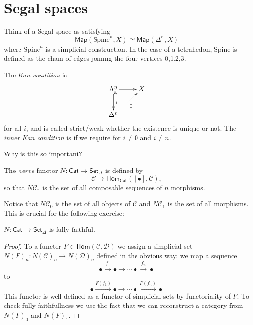 \section{Segal spaces}
\label{section-segal}


\begin{remark}
\label{remark-Segal-spaces}
Think of a Segal space as satisfying
$$
\mathsf{Map}(\text{Spine}^n,X) \simeq \mathsf{Map}(\Delta^n,X)
$$
where $\text{Spine}^n$ is a simplicial construction. 
In the case of a tetrahedon, $\text{Spine}$ is defined as the
chain of edges joining the four vertices 0,1,2,3.
\end{remark}


The {\it Kan condition} is
$$
\xymatrix{
\Lambda^n_i\ar@{^{(}->}[d]^i \ar[r]&  X\\
\Delta^n\ar@{.>}[ur]_{\exists }
}
$$
for all $i$, 
and is called strict/weak whether the existence
is unique or not. The {\it inner Kan condition} 
is if we require for $i \neq 0$ and $i\neq n$.

Why is this so important?

\begin{definition}
\label{definition-nerve}
The {\it nerve} functor $N:\mathsf{Cat} \to \mathsf{Set}_\Delta$ 
is defined by
$$
\mathcal{C} \mapsto  \mathsf{Hom}_{\mathsf{Cat}}([\bullet],\mathcal{C}),
$$
so that $N\mathcal{C}_n$ is the set
of all composable sequences of $n$ morphisms.
\end{definition}

Notice that $N\mathcal{C}_0$ is the set of all objects of $\mathcal{C}$ 
and $N\mathcal{C}_1$ is the set of all morphisms.
This is crucial for the following exercise:

\begin{exercise}
\label{exercise-}
$N:\mathsf{Cat}\to\mathsf{Set}_\Delta$ is fully faithful.
\end{exercise}

\begin{proof}
To a functor $F \in \mathsf{Hom}(\mathcal{C},\mathcal{D})$ 
we assign a simplicial set $N(F)_n:N(\mathcal{C})_n \to N(\mathcal{D})_n$ 
defined in the obvious way: we map a sequence
$$
\bullet \xrightarrow{f_1}\bullet\to \cdots \bullet \xrightarrow{f_n}\bullet
$$
to
$$
\bullet \xrightarrow{F(f_1)}\bullet \to \cdots
\bullet\xrightarrow{F(f_n)}\bullet
$$
This functor is well defined as a functor
of simplicial sets by functoriality of $F$.
To check fully faithfullness we use the fact
that we can reconstruct a category from 
$N(F)_0$ and $N(F)_1$.
\end{proof}

